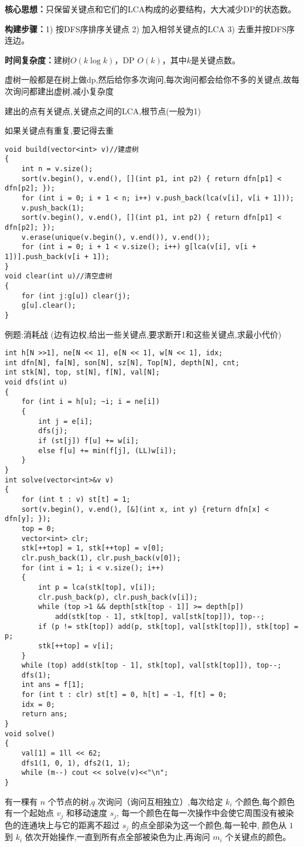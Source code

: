 \documentclass[a4paper, fontset=none]{ctexart}
\begin{document}
\textbf{核心思想：}只保留关键点和它们的LCA构成的必要结构，大大减少DP的状态数。

\textbf{构建步骤：}1) 按DFS序排序关键点 2) 加入相邻关键点的LCA 3) 去重并按DFS序连边。

\textbf{时间复杂度：}建树$O(k\log k)$，DP $O(k)$，其中$k$是关键点数。

虚树一般都是在树上做dp,然后给你多次询问,每次询问都会给你不多的关键点,故每次询问都建出虚树,减小复杂度

建出的点有关键点,关键点之间的LCA,根节点(一般为1)

如果关键点有重复,要记得去重

\begin{verbatim}
void build(vector<int> v)//建虚树
{
    int n = v.size();
    sort(v.begin(), v.end(), [](int p1, int p2) { return dfn[p1] < dfn[p2]; });
    for (int i = 0; i + 1 < n; i++) v.push_back(lca(v[i], v[i + 1]));
    v.push_back(1);
    sort(v.begin(), v.end(), [](int p1, int p2) { return dfn[p1] < dfn[p2]; });
    v.erase(unique(v.begin(), v.end()), v.end());
    for (int i = 0; i + 1 < v.size(); i++) g[lca(v[i], v[i + 1])].push_back(v[i + 1]);
}
void clear(int u)//清空虚树
{
    for (int j:g[u]) clear(j);
    g[u].clear();
}
\end{verbatim}


例题:消耗战 (边有边权,给出一些关键点,要求断开1和这些关键点,求最小代价)

\begin{verbatim}
int h[N >>1], ne[N << 1], e[N << 1], w[N << 1], idx;
int dfn[N], fa[N], son[N], sz[N], Top[N], depth[N], cnt;
int stk[N], top, st[N], f[N], val[N];
void dfs(int u)
{
    for (int i = h[u]; ~i; i = ne[i])
    {
        int j = e[i];
        dfs(j);
        if (st[j]) f[u] += w[i];
        else f[u] += min(f[j], (LL)w[i]);
    }
}
int solve(vector<int>&v v)
{
    for (int t : v) st[t] = 1;
    sort(v.begin(), v.end(), [&](int x, int y) {return dfn[x] < dfn[y]; });
    top = 0;
    vector<int> clr;
    stk[++top] = 1, stk[++top] = v[0];
    clr.push_back(1), clr.push_back(v[0]);
    for (int i = 1; i < v.size(); i++)
    {
        int p = lca(stk[top], v[i]);
        clr.push_back(p), clr.push_back(v[i]);
        while (top >1 && depth[stk[top - 1]] >= depth[p])
            add(stk[top - 1], stk[top], val[stk[top]]), top--;
        if (p != stk[top]) add(p, stk[top], val[stk[top]]), stk[top] = p;
        stk[++top] = v[i];
    }
    while (top) add(stk[top - 1], stk[top], val[stk[top]]), top--;
    dfs(1);
    int ans = f[1];
    for (int t : clr) st[t] = 0, h[t] = -1, f[t] = 0;
    idx = 0;
    return ans;
}
void solve()
{
    val[1] = 1ll << 62;
    dfs1(1, 0, 1), dfs2(1, 1);
    while (m--) cout << solve(v)<<"\n";
}
\end{verbatim}
有一棵有 $n$ 个节点的树,$q$ 次询问（询问互相独立）,每次给定 $k_i$ 个颜色,每个颜色有一个起始点 $v_j$ 和移动速度 $s_j$,
每一个颜色在每一次操作中会使它周围没有被染色的连通块上与它的距离不超过 $s_j$ 的点全部染为这一个颜色,每一轮中,
颜色从 $1$ 到 $k_i$ 依次开始操作,一直到所有点全部被染色为止,再询问 $m_i$ 个关键点的颜色。
\end{document}
